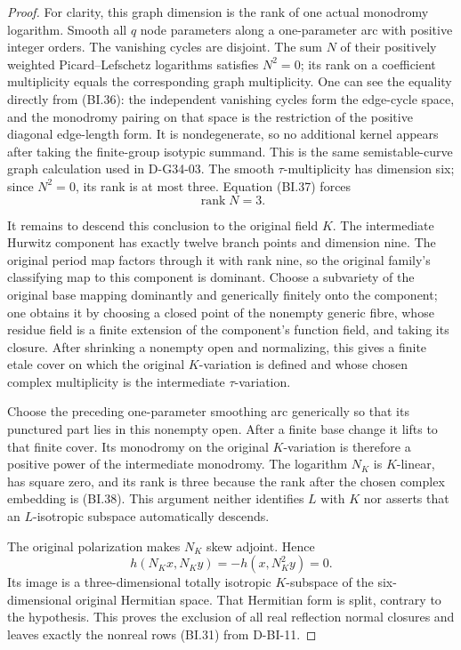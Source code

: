\begin{proof}
For clarity, this graph dimension is the rank of one actual
monodromy logarithm.  Smooth all $q$ node parameters along a
one-parameter arc with positive integer orders.  The vanishing
cycles are disjoint.  The sum $N$ of their positively weighted
Picard--Lefschetz logarithms satisfies $N^2=0$; its rank on a
coefficient multiplicity equals the corresponding graph multiplicity.
One can see the equality directly from (BI.36): the independent
vanishing cycles form the edge-cycle space, and the monodromy
pairing on that space is the restriction of the positive diagonal
edge-length form.  It is nondegenerate, so no additional kernel
appears after taking the finite-group isotypic summand.  This is
the same semistable-curve graph calculation used in D-G34-03.
The smooth $\tau$-multiplicity has dimension six; since $N^2=0$,
its rank is at most three.  Equation (BI.37) forces
\[
                             \operatorname{rank}N=3.          \tag{BI.38}
\]

It remains to descend this conclusion to the original field $K$.
The intermediate Hurwitz component has exactly twelve branch points
and dimension nine.  The original period map factors through it
with rank nine, so the original family's classifying map to this
component is dominant.  Choose a subvariety of the original base
mapping dominantly and generically finitely onto the component;
one obtains it by choosing a closed point of the nonempty generic
fibre, whose residue field is a finite extension of the component's
function field, and taking its closure.  After shrinking a nonempty open and normalizing,
this gives a finite etale cover on which the original $K$-variation
is defined and whose chosen complex multiplicity is the intermediate
$\tau$-variation.

Choose the preceding one-parameter smoothing arc generically so
that its punctured part lies in this nonempty open.  After a finite
base change it lifts to that finite cover.  Its monodromy on the
original $K$-variation is therefore a positive power of the
intermediate monodromy.  The logarithm $N_K$ is $K$-linear,
has square zero, and its rank is three because the rank after the
chosen complex embedding is (BI.38).  This argument neither
identifies $L$ with $K$ nor asserts that an $L$-isotropic subspace
automatically descends.

The original polarization makes $N_K$ skew adjoint.  Hence
\[
 h(N_Kx,N_Ky)=-h(x,N_K^2y)=0.
\]
Its image is a three-dimensional totally isotropic $K$-subspace
of the six-dimensional original Hermitian space.  That Hermitian
form is split, contrary to the hypothesis.  This proves the
exclusion of all real reflection normal closures and leaves
exactly the nonreal rows (BI.31) from D-BI-11.
\end{proof}
